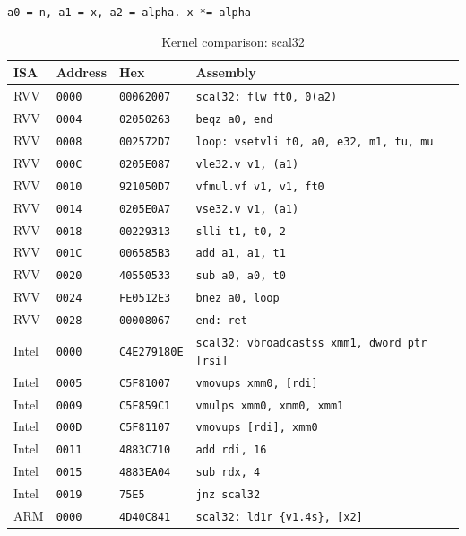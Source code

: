 \begin{table}[htbp]
\centering
\caption{Kernel comparison: scal32}
\begingroup
\scriptsize
\setlength{\tabcolsep}{4pt}
\noindent \texttt{a0 = n, a1 = x, a2 = alpha. x *= alpha}\par
\vspace{0.6ex}
\begin{tabular}{@{}l|l|l|p{7.2cm}@{}}
\toprule
ISA & Address & Hex & Assembly \\
\midrule
RVV & \texttt{0000} & \texttt{00062007} & \texttt{scal32: flw ft0, 0(a2)} \\
RVV & \texttt{0004} & \texttt{02050263} & \texttt{beqz a0, end} \\
RVV & \texttt{0008} & \texttt{002572D7} & \texttt{loop: vsetvli t0, a0, e32, m1, tu, mu} \\
RVV & \texttt{000C} & \texttt{0205E087} & \texttt{vle32.v v1, (a1)} \\
RVV & \texttt{0010} & \texttt{921050D7} & \texttt{vfmul.vf v1, v1, ft0} \\
RVV & \texttt{0014} & \texttt{0205E0A7} & \texttt{vse32.v v1, (a1)} \\
RVV & \texttt{0018} & \texttt{00229313} & \texttt{slli t1, t0, 2} \\
RVV & \texttt{001C} & \texttt{006585B3} & \texttt{add a1, a1, t1} \\
RVV & \texttt{0020} & \texttt{40550533} & \texttt{sub a0, a0, t0} \\
RVV & \texttt{0024} & \texttt{FE0512E3} & \texttt{bnez a0, loop} \\
RVV & \texttt{0028} & \texttt{00008067} & \texttt{end: ret} \\
\midrule
Intel & \texttt{0000} & \texttt{C4E279180E} & \texttt{scal32: vbroadcastss xmm1, dword ptr [rsi]} \\
Intel & \texttt{0005} & \texttt{C5F81007} & \texttt{vmovups xmm0, [rdi]} \\
Intel & \texttt{0009} & \texttt{C5F859C1} & \texttt{vmulps xmm0, xmm0, xmm1} \\
Intel & \texttt{000D} & \texttt{C5F81107} & \texttt{vmovups [rdi], xmm0} \\
Intel & \texttt{0011} & \texttt{4883C710} & \texttt{add rdi, 16} \\
Intel & \texttt{0015} & \texttt{4883EA04} & \texttt{sub rdx, 4} \\
Intel & \texttt{0019} & \texttt{75E5} & \texttt{jnz scal32} \\
\midrule
ARM & \texttt{0000} & \texttt{4D40C841} & \texttt{scal32: ld1r \{v1.4s\}, [x2]} \\

\end{tabular}
\end{table}
